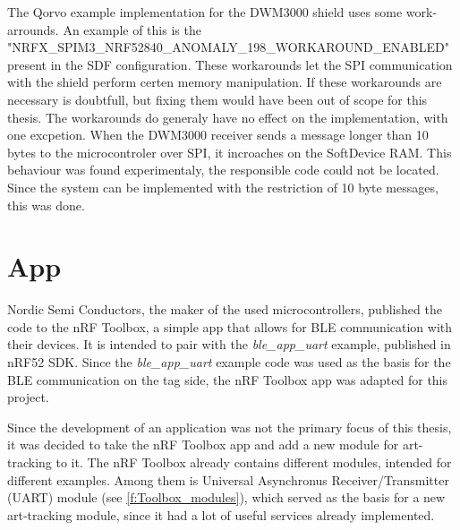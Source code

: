 The Qorvo example implementation for the DWM3000 shield uses some work-arrounds. An example of this is the "NRFX{\_}SPIM3{\_}NRF52840{\_}ANOMALY{\_}198{\_}WORKAROUND{\_}ENABLED" present in the SDF configuration. These workarounds let the SPI communication with the shield perform certen memory manipulation. If these workarounds are necessary is doubtfull, but fixing them would have been out of scope for this thesis.
The workarounds do generaly have no effect on the implementation, with one excpetion. When the DWM3000 receiver sends a message longer than 10 bytes to the microcontroler over SPI, it incroaches on the SoftDevice RAM. This behaviour was found experimentaly, the responsible code could not be located. Since the system can be implemented with the restriction of 10 byte messages, this was done.



\section{App}
\label{s:app}
Nordic Semi Conductors, the maker of the used microcontrollers, published the code to the nRF Toolbox, a simple app that allows for BLE communication with their devices.
It is intended to pair with the \textit{ble{\_}app{\_}uart} example, published in nRF52 SDK.
Since the \textit{ble{\_}app{\_}uart} example code was used as the basis for the BLE communication on the tag side, the nRF Toolbox app was adapted for this project.

Since the development of an application was not the primary focus of this thesis, it was decided to take the nRF Toolbox app and add a new module for art-tracking to it.
The nRF Toolbox already contains different modules, intended for different examples.
Among them is Universal Asynchronus Receiver/Transmitter (UART) module (see \ref{f:Toolbox_modules}), which served as the basis for a new art-tracking module, since it had a lot of useful services already implemented.

